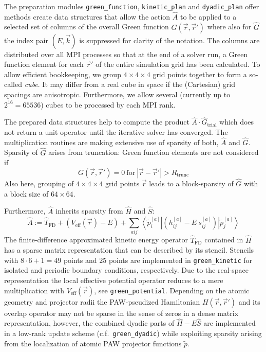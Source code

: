 \documentclass[oribibl]{llncs}
\newcommand{\um}[1]{_{\mathrm{#1}}}
\newcommand{\ttt}[1]{\texttt{#1}}
\newcommand{\braketop}[3]{\left\langle \left. #1 \right| #2 \left| #3 \right. \right\rangle}
\begin{document}
\noindent
The preparation modules \ttt{green\_function}, \ttt{kinetic\_plan} and \ttt{dyadic\_plan} offer methods create data structures that allow the action $\hat A$ to be applied to a selected set of columns of the overall Green function $\hat G(\vec r, \vec r')$ where also for $\hat G$ the index pair $(E,\vec k)$ is suppressed for clarity of the notation.
The columns are distributed over all \ac{MPI} processes so that at the end of a solver run, a Green function element for each $\vec r'$ of the entire simulation grid has been calculated.
To allow efficient bookkeeping, we group $4 \times 4 \times 4$ grid points together to form a so-called \emph{cube}.
It may differ from a real cube in space if the (Cartesian) grid spacings are anisotropic.
Furthermore, we allow several (currently up to $2^{16}=65536$) cubes to be processed by each \ac{MPI} rank.

The prepared data structures help to compute the product $\hat A \cdot \hat G\um{trial}$ which does not return a unit operator until the iterative solver has converged. The multiplication routines are making extensive use of sparsity of both, $\hat A$ and $\hat G$. Sparsity of $\hat G$ arises from truncation: Green function elements are not considered if 
\begin{equation}
	G(\vec r,\vec r') = 0 \  \text{for} \  |\vec r - \vec r'| > R\um{trunc}
\end{equation}
Also here, grouping of $4 \times 4 \times 4$ grid points $\vec r$ leads to a block-sparsity of $\hat G$ with a block size of $64 \times 64$.

Furthermore, $\hat A$ inherits sparsity from $\hat H$ and $\hat S$:
\begin{equation}
	\hat A := \hat T\um{FD} + \left(V\um{eff}(\vec r) - E\right) + \sum_{aij} \braketop{\tilde p^{[a]}_i}{(h^{[a]}_{ij} - E\ s^{[a]}_{ij})}{\tilde p^{[a]}_j}
\end{equation}
The finite-difference approximated kinetic energy operator $\hat T\um{FD}$ contained in $\hat H$ 
has a sparse matrix representation that can be described by its stencil. 
Stencils with $8\cdot 6 + 1 = 49$ points and $25$ points are implemented in \ttt{green\_kinetic}
for isolated and periodic boundary conditions, respectively.
Due to the real-space representation the local effective potential operator reduces to a mere multiplication with $V\um{eff}(\vec r)$, see \ttt{green\_potential}.
Depending on the atomic geometry and projector radii the \ac{PAW}-pseudized Hamiltonian $H(\vec r,\vec r')$ and its overlap operator may not be sparse in the sense of zeros in a dense matrix representation,
however, the combined dyadic parts of $\hat H - E\hat S$ are implemented in a low-rank update scheme (c.f.~\ttt{green\_dyadic}) while exploiting sparsity arising from the localization of atomic \ac{PAW} projector functions $\tilde p$.
\end{document}
